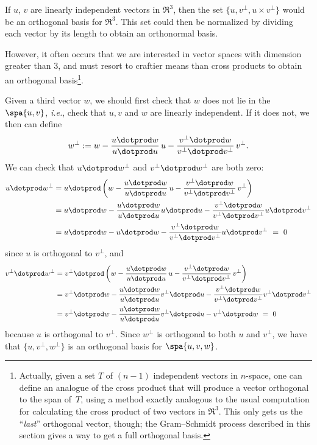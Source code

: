 If $u$, $v$ are linearly independent vectors in $\Re^3$, then the set $\{u, v^\perp, u\times v^\perp \}$ would be an orthogonal basis for $\Re^3$.  This set could then be normalized by dividing each vector by its length to obtain an orthonormal basis.

However, it often occurs that we are interested in vector spaces with dimension greater than $3$, and must resort to craftier means than cross products to obtain an orthogonal basis\footnote{Actually, given a set $T$ of $(n-1)$ independent vectors in $n$-space, one can define an analogue of the cross product that will produce a vector orthogonal to the span of~$T$, using a method exactly analogous to the usual computation for calculating the cross product of two vectors in $\Re^3$.  This only gets us the ``\emph{last}'' orthogonal vector, though; the Gram--Schmidt process described in this section gives a way to get a full orthogonal basis.}.

Given a third vector $w$, we should first check that $w$ does not lie in the 
$\spa\{ u,v\} $, \textit{i.e.}, check that $u,v$ and $w$ are linearly independent.   If it does not, we then can define
\[
w^\perp := w - \frac{u\dotprod w}{u\dotprod u}\,u - \frac{v^\perp\dotprod w}{v^\perp\dotprod v^\perp}\,v^\perp.
\]
We can check that \(u \dotprod w^\perp\) and \(v^\perp \dotprod w^\perp\) are both zero:
\begin{align*}
u \dotprod w^\perp&=u \dotprod \left(w - \frac{u\dotprod w}{u\dotprod u}\,u - \frac{v^\perp\dotprod w}{v^\perp\dotprod v^\perp}\,v^\perp \right)\\&= u\dotprod w - \frac{u \dotprod w}{u \dotprod u}u \dotprod u - \frac{v^\perp \dotprod w}{v^\perp \dotprod v^\perp} u \dotprod v^\perp \\
&=u\dotprod w-u\dotprod w-\frac{v^\perp \dotprod w}{v^\perp \dotprod v^\perp} u \dotprod v^\perp\ =\ 0
\end{align*}
since \(u\) is orthogonal to \(v^\perp\), and
\begin{align*}
v^\perp \dotprod w^\perp&=v^\perp \dotprod \left(w - \frac{u\dotprod w}{u\dotprod u}\,u - \frac{v^\perp\dotprod w}{v^\perp\dotprod v^\perp}\,v^\perp \right)\\ &=v^\perp\dotprod w - \frac{u \dotprod w}{u \dotprod u}v^\perp \dotprod u - \frac{v^\perp \dotprod w}{v^\perp \dotprod v^\perp} v^\perp \dotprod v^\perp \\
&=v^\perp\dotprod w-\frac{u \dotprod w}{u \dotprod u}v^\perp \dotprod u - v^\perp \dotprod w\ =\ 0
\end{align*}
because \(u\) is orthogonal to \(v^\perp\). Since $w^\perp$ is orthogonal to both $u$ and $v^\perp$, we have that $\{u,v^\perp,w^\perp \}$ is an orthogonal basis for $\spa \{u,v,w\}$.

